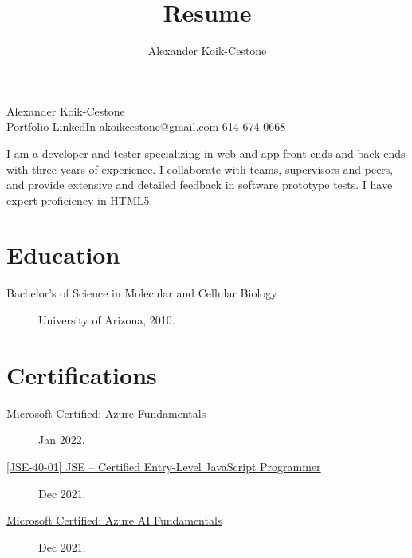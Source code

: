 \documentclass{article}
\author{Alexander Koik-Cestone}
\title{Resume}
\begin{document}
\begin{center}
{\huge Alexander Koik-Cestone\vspace{0.3cm}} \\
\href{https://sirkoik.github.io#portfolio}{Portfolio}
\textcolor{gray}{\textbullet}
\href{https://www.linkedin.com/in/alexander-koik-cestone-89304556/}{LinkedIn}
\textcolor{gray}{\textbullet}
\href{mailto:akoikcestone@gmail.com}{akoikcestone@gmail.com}
\textcolor{gray}{\textbullet}
\href{tel:614-674-0668}{614-674-0668} \\
\end{center}

\noindent
I am a developer and tester specializing in web and app front-ends and back-ends with three years of experience. I collaborate with teams, supervisors and peers, and provide extensive and detailed feedback in software prototype tests. I have expert proficiency in HTML5.

\section*{Education}\vspace{-0.5em}
\begin{description}
  \item[Bachelor's of Science in Molecular and Cellular Biology] University of Arizona, 2010.
\end{description}

\vspace{-1em}
\section*{Certifications}\vspace{-0.5em}
\begin{description}
  \item [\href{https://www.credly.com/badges/56339905-a587-4fdb-9906-c2d2bb5d31da/public_url}{Microsoft Certified: Azure Fundamentals}] Jan 2022.
  \item [\href{https://www.credly.com/badges/e75210e4-8d08-43ea-af72-ec70ef666eee/public_url}{[JSE-40-01] JSE – Certified Entry-Level JavaScript Programmer}] Dec 2021.
  \item [\href{https://www.credly.com/badges/fa66cf6b-dff5-4f58-9f4e-4b94fc91b7fa/public_url}{Microsoft Certified: Azure AI Fundamentals}] Dec 2021.
\end{description}
\end{document}
